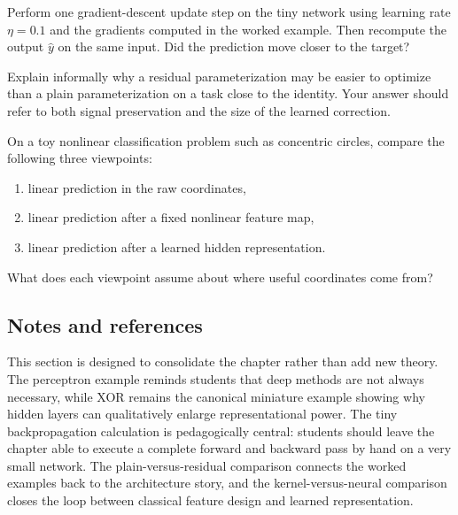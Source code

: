 \begin{exercise}
Perform one gradient-descent update step on the tiny network using learning rate $\eta=0.1$ and the gradients computed in the worked example.
Then recompute the output $\hat y$ on the same input.
Did the prediction move closer to the target?
\end{exercise}

\begin{exercise}
Explain informally why a residual parameterization may be easier to optimize than a plain parameterization on a task close to the identity.
Your answer should refer to both signal preservation and the size of the learned correction.
\end{exercise}

\begin{exercise}
On a toy nonlinear classification problem such as concentric circles, compare the following three viewpoints:
\begin{enumerate}
    \item linear prediction in the raw coordinates,
    \item linear prediction after a fixed nonlinear feature map,
    \item linear prediction after a learned hidden representation.
\end{enumerate}
What does each viewpoint assume about where useful coordinates come from?
\end{exercise}

\subsection*{Notes and references}

This section is designed to consolidate the chapter rather than add new theory.
The perceptron example reminds students that deep methods are not always necessary, while XOR remains the canonical miniature example showing why hidden layers can qualitatively enlarge representational power.
The tiny backpropagation calculation is pedagogically central: students should leave the chapter able to execute a complete forward and backward pass by hand on a very small network.
The plain-versus-residual comparison connects the worked examples back to the architecture story, and the kernel-versus-neural comparison closes the loop between classical feature design and learned representation.
